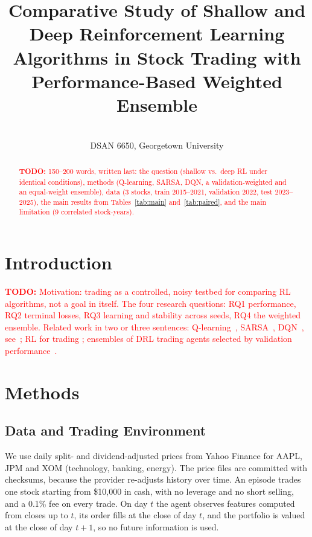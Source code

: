 \documentclass[11pt]{article}
\title{Comparative Study of Shallow and Deep Reinforcement Learning\\
Algorithms in Stock Trading with Performance-Based Weighted Ensemble}
\author{\todo{Team member names}\\DSAN 6650, Georgetown University}
\date{\todo{Submission date}}
\newcommand{\todo}[1]{\textcolor{red}{\textbf{TODO:} #1}}
\begin{document}
\maketitle

\begin{abstract}
\todo{150--200 words, written last: the question (shallow vs.\ deep RL under
identical conditions), methods (Q-learning, SARSA, DQN, a validation-weighted
and an equal-weight ensemble), data (3 stocks, train 2015--2021, validation
2022, test 2023--2025), the main results from Tables~\ref{tab:main}
and~\ref{tab:paired}, and the main limitation (9 correlated stock-years).}
\end{abstract}

\section{Introduction}
\label{sec:intro}
\todo{Motivation: trading as a controlled, noisy testbed for comparing RL
algorithms, not a goal in itself. The four research questions: RQ1
performance, RQ2 terminal losses, RQ3 learning and stability across seeds,
RQ4 the weighted ensemble. Related work in two or three sentences:
Q-learning~\cite{watkins1992q}, SARSA~\cite{rummery1994online},
DQN~\cite{mnih2015human}, see~\cite{sutton2018reinforcement}; RL for trading
\cite{moody2001learning,deng2017deep}; ensembles of DRL trading agents
selected by validation performance~\cite{yang2020ensemble}.}

\section{Methods}
\label{sec:methods}

\subsection{Data and Trading Environment}
We use daily split- and dividend-adjusted prices from Yahoo Finance for
AAPL, JPM and XOM (technology, banking, energy). The price files are
committed with checksums, because the provider re-adjusts history over time.
An episode trades one stock starting from \$10{,}000 in cash, with no
leverage and no short selling, and a 0.1\% fee on every trade. On day $t$
the agent observes features computed from closes up to $t$, its order fills
at the close of day $t$, and the portfolio is valued at the close of day
$t+1$, so no future information is used.
\end{document}
